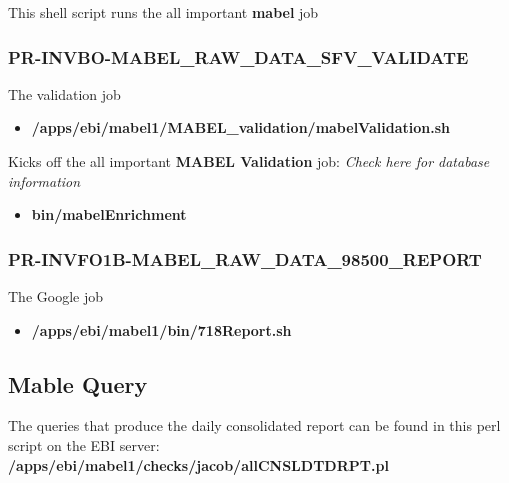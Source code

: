 \documentclass[12pt,twoside]{article}
\begin{document}
This shell script runs the all important \textbf{mabel} job
\subsubsection{PR-INVBO-MABEL\_RAW\_DATA\_SFV\_VALIDATE}
\label{sec:orgheadline44}
The validation job 
\begin{itemize}
\item \textbf{/apps/ebi/mabel1/MABEL\_validation/mabelValidation.sh}
\end{itemize}

Kicks off the all important \textbf{MABEL Validation} job: \emph{Check here for database information}
\begin{itemize}
\item \textbf{bin/mabelEnrichment}
\end{itemize}
\subsubsection{PR-INVFO1B-MABEL\_RAW\_DATA\_98500\_REPORT}
\label{sec:orgheadline45}
The Google job
\begin{itemize}
\item \textbf{/apps/ebi/mabel1/bin/718Report.sh}
\end{itemize}
\normalsize
\subsection{Mable Query}
\label{sec:orgheadline47}
The queries that produce the daily consolidated report can be found in this perl script on the EBI server: \textbf{/apps/ebi/mabel1/checks/jacob/allCNSLDTDRPT.pl}
\end{document}

